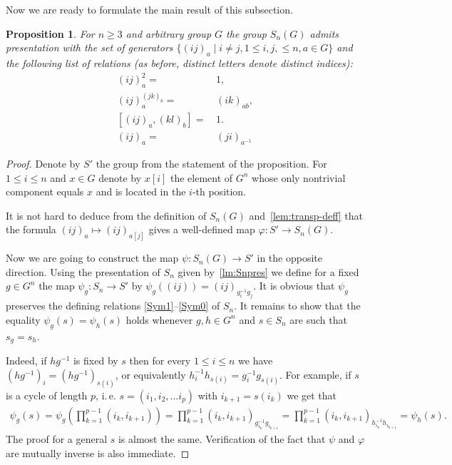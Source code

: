 \documentclass[oneside, 10pt]{amsart}
\theoremstyle{plain}
\numberwithin{equation}{section}
\numberwithin{lemma}{section}
\newtheorem{prop}[lemma]{Proposition}
\theoremstyle{remark}
\theoremstyle{definition}
\begin{document}
Now we are ready to formulate the main result of this subsection.
\begin{prop} \label{prop:Q-pres} For $n\geq 3$ and arbitrary group $G$ the group $S_n(G)$ admits presentation with the set of generators 
$\{(ij)_a \mid i\neq j, 1\leq i,j,\leq n, a\in G\}$ and the following list of relations (as before, distinct letters denote distinct indices):
\begin{align}
(ij)_a^2 = &\, 1,                \label{Q1} \tag{SG1} \\
(ij)_a^{(jk)_b} = &\, (ik)_{ab}, \label{Q2} \tag{SG2} \\
[(ij)_a, (kl)_b] = &\,1.         \label{Q3} \tag{SG3} \\
(ij)_a =&\, (ji)_{a^{-1}}        \label{Q4} \tag{SG4} 
\end{align}
\end{prop}
\begin{proof}
Denote by $S'$ the group from the statement of the proposition.
For $1\leq i\leq n$ and $x\in G$ denote by $x[i]$ the element of $G^n$ 
 whose only nontrivial component equals $x$ and is located in the $i$-th position.

It is not hard to deduce from the definition of $S_n(G)$ and~\cref{lem:transp-deff} 
 that the formula $(ij)_a \mapsto (ij)_{a[j]}$ gives a well-defined map $\varphi\colon S'\to S_n(G)$.

Now we are going to construct the map $\psi\colon S_n(G)\to S'$ in the opposite direction. 
Using the presentation of $S_n$ given by~\cref{lm:Snpres}  we define for a fixed $g\in G^n$ the map 
 $\psi_g\colon S_n \to S'$ by $\psi_g((ij)) = (ij)_{g_i^{-1} g_j}.$
It is obvious that $\psi_g$ preserves the defining relations \eqref{Sym1}--\eqref{Sym0} of $S_n$. 
It remains to show that the equality $\psi_g(s) = \psi_h(s)$ holds whenever $g, h\in G^n$ and $s\in S_n$ are such that $s_g=s_h$.

Indeed, if $hg^{-1}$ is fixed by $s$ then for every $1\leq i\leq n$ we have $(hg^{-1})_i = (hg^{-1})_{s(i)}$, or equivalently
$h_i^{-1} h_{s(i)} = g_i^{-1} g_{s(i)}$. %
For example, if $s$ is a cycle of length $p$, i.\,e. $s=(i_1, i_2, \ldots i_p)$ with $i_{k+1} = s(i_k)$ we get that
\begin{multline} \nonumber
 \psi_g(s) = \psi_g\left({\prod\limits_{k=1}^{p-1}(i_k, i_{k+1})}\right) = 
 \prod\limits_{k=1}^{p-1}\left(i_k, i_{k+1}\right)_{g_{i_k}^{-1} g_{i_{k+1}}} = 
 \prod\limits_{k=1}^{p-1}\left(i_k, i_{k+1}\right)_{h_{i_k}^{-1} h_{i_{k+1}}} = \psi_h(s).
\end{multline}
The proof for a general $s$ is almost the same.
Verification of the fact that $\psi$ and $\varphi$ are mutually inverse is also immediate.
\end{proof}
\end{document}
